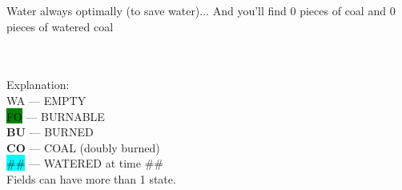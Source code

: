 Water always optimally (to save water)...
And you'll find 0 pieces of coal and 0 pieces of watered coal
\\
\\
\\
Explanation:\\
\colorbox{white}{\color[gray]{0.5}WA}  ---  EMPTY\\
\colorbox{green}{\color[gray]{0.5}FO}  ---  BURNABLE\\
\colorbox{white}{\color[rgb]{1,0,0}\textbf{BU}}  ---  BURNED\\
\colorbox{white}{\color[rgb]{0,0,0}\textbf{CO}}  ---  COAL (doubly burned)\\
\colorbox{cyan}{\#\#}  ---  WATERED at time \#\#\\
Fields can have more than 1 state.